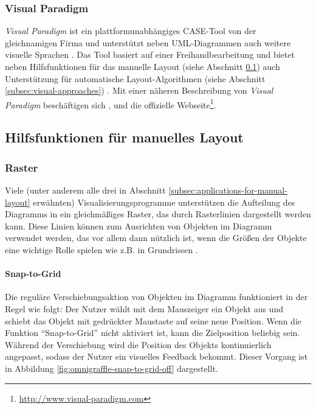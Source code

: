 \subsubsection{Visual Paradigm}
\label{subsubsec:visual-paradigm}

\textit{Visual Paradigm} ist ein plattformunabhängiges CASE-Tool von der gleichnamigen Firma und unterstützt neben UML-Diagrammen auch weitere visuelle Sprachen \cite{14Visual}. Das Tool basiert auf einer Freihandbearbeitung und bietet neben Hilfsfunktionen für das manuelle Layout (siehe Abschnitt \ref{subsec:help-functions-for-manual-layout}) auch Unterstützung für automatische Layout-Algorithmen (siehe Abschnitt \ref{subsec:visual-approaches}) \cite{Fuhrmann11On-the-Pragmatics}. Mit einer näheren Beschreibung von \textit{Visual Paradigm} beschäftigen sich \cite{14Visual}, \cite[S.313-314]{Fuhrmann11On-the-Pragmatics} und die offizielle Webseite\footnote{\url{http://www.visual-paradigm.com}}.

\subsection{Hilfsfunktionen für manuelles Layout}
\label{subsec:help-functions-for-manual-layout}

\subsubsection{Raster}
\label{subsubsec:grid}

Viele (unter anderem alle drei in Abschnitt \ref{subsec:applications-for-manual-layout} erwähnten) Visualisierungsprogramme unterstützen die Aufteilung des Diagramms in ein gleichmäßiges Raster, das durch Rasterlinien dargestellt werden kann. Diese Linien können zum Ausrichten von Objekten im Diagramm verwendet werden, das vor allem dann nützlich ist, wenn die Größen der Objekte eine wichtige Rolle spielen wie z.B. in Grundrissen \cite{08OmniGraffle, Olsen10OmniGraffle, 11Keynote, 14Visual}.

\paragraph{Snap-to-Grid}

Die reguläre Verschiebungsaktion von Objekten im Diagramm funktioniert in der Regel wie folgt: Der Nutzer wählt mit dem Mauszeiger ein Objekt aus und schiebt das Objekt mit gedrückter Maustaste auf seine neue Position. Wenn die Funktion \enquote{Snap-to-Grid} nicht aktiviert ist, kann die Zielposition beliebig sein. Während der Verschiebung wird die Position des Objekts kontinuierlich angepasst, sodass der Nutzer ein visuelles Feedback bekommt. Dieser Vorgang ist in Abbildung \ref{fig:omnigraffle-snap-to-grid-off} dargestellt.

